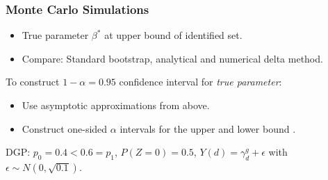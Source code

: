 \documentclass[11pt, aspectratio=169]{beamer}
\begin{document}



\begin{frame}
    \frametitle{Monte Carlo Simulations}

    \begin{itemize}
        \item True parameter $\beta^*$ at upper bound of identified set.
        \item Compare: Standard bootstrap, analytical and numerical delta method.
    \end{itemize}

    \vspace{0.5cm}

    To construct $1-\alpha = 0.95$ confidence interval for \textit{true parameter}:
    \begin{itemize}
        \item Use asymptotic approximations from above.
        \item Construct one-sided $\alpha$ intervals for the upper and lower bound \citep{imbens2004confidence}.
    \end{itemize}

    \vspace{0.5cm}

    DGP\@: $p_0 = 0.4 < 0.6 = p_1$, $P(Z=0)=0.5$, $Y(d) = \gamma_d^g + \epsilon$ with $\epsilon\sim N(0, \sqrt{0.1})$.


\end{frame}
\end{document}
